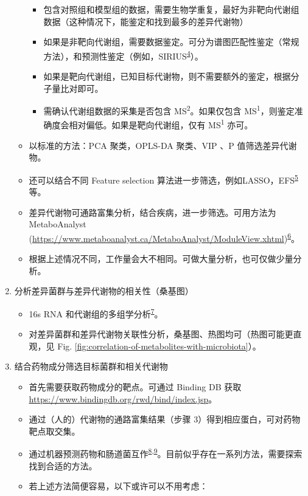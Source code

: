 \documentclass[
]{article}
\providecommand{\tightlist}{%
  \setlength{\itemsep}{0pt}\setlength{\parskip}{0pt}}
\begin{document}
\begin{enumerate}
\begin{itemize}
    \begin{itemize}
    \tightlist
    \item
      包含对照组和模型组的数据，需要生物学重复，最好为非靶向代谢组数据（这种情况下，能鉴定和找到最多的差异代谢物）
    \item
      如果是非靶向代谢组，需要数据鉴定。可分为谱图匹配性鉴定（常规方法），和预测性鉴定（例如，SIRIUS\textsuperscript{\protect\hyperlink{ref-Sirius4ARapDuhrko2019}{4}}）。
    \item
      如果是靶向代谢组，已知目标代谢物，则不需要额外的鉴定，根据分子量比对即可。
    \item
      需确认代谢组数据的采集是否包含 MS\textsuperscript{2}。如果仅包含 MS\textsuperscript{1}，则鉴定准确度会相对偏低。如果是靶向代谢组，仅有 MS\textsuperscript{1} 亦可。
    \end{itemize}
  \item
    以标准的方法：PCA 聚类，OPLS-DA 聚类、VIP 、P 值筛选差异代谢物。
  \item
    还可以结合不同 Feature selection 算法进一步筛选，例如LASSO，EFS\textsuperscript{\protect\hyperlink{ref-EfsAnEnsemblNeuman2017}{5}}等。
  \item
    差异代谢物可通路富集分析，结合疾病，进一步筛选。可用方法为 MetaboAnalyst (\url{https://www.metaboanalyst.ca/MetaboAnalyst/ModuleView.xhtml})\textsuperscript{\protect\hyperlink{ref-MetaboanalystrPang2020}{6}}。
  \item
    根据上述情况不同，工作量会大不相同。可做大量分析，也可仅做少量分析。
  \end{itemize}
\item
  分析差异菌群与差异代谢物的相关性（桑基图）

  \begin{itemize}
  \tightlist
  \item
    16s RNA 和代谢组的多组学分析\textsuperscript{\protect\hyperlink{ref-DisruptedSpermZhang2021}{7}}。
  \item
    对差异菌群和差异代谢物关联性分析，桑基图、热图均可（热图可能更直观，见 Fig. \ref{fig:correlation-of-metabolites-with-microbiota}）。
  \end{itemize}
\item
  结合药物成分筛选目标菌群和相关代谢物

  \begin{itemize}
  \tightlist
  \item
    首先需要获取药物成分的靶点。可通过 Binding DB 获取 \url{https://www.bindingdb.org/rwd/bind/index.jsp}。
  \item
    通过（人的）代谢物的通路富集结果（步骤 3）得到相应蛋白，可对药物靶点取交集。
  \item
    通过机器预测药物和肠道菌互作\textsuperscript{\protect\hyperlink{ref-PredictingDrugMccoub2022}{8},\protect\hyperlink{ref-MachineLearninMccoub2021}{9}}。目前似乎存在一系列方法，需要探索找到合适的方法。
  \item
    若上述方法简便容易，以下或许可以不用考虑：


\end{itemize}
\end{enumerate}
\end{document}
